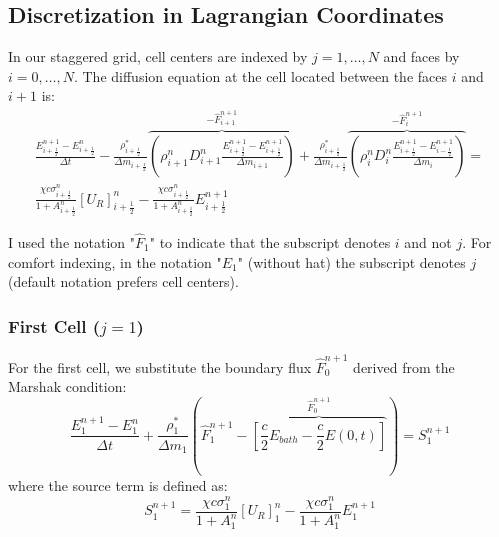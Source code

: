 \documentclass[11pt]{article}
\begin{document}
\subsection{Discretization in Lagrangian Coordinates}
In our staggered grid, cell centers are indexed by $j=1, \dots, N$ and faces by $i=0, \dots, N$. The diffusion equation at the cell located between the faces $i$ and $i+1$ is:
\begin{equation}
\begin{gathered}
    \frac{E_{i+\frac{1}{2}}^{n+1} - E_{i+\frac{1}{2}}^n}{\Delta t} - \frac{\rho_{i+\frac{1}{2}}^{*}}{\Delta m_{i+\frac{1}{2}}} \overbrace{\left(\rho_{i+1}^n D_{i+1}^n\frac{E_{i+\frac{3}{2}}^{n+1} - E_{i+\frac{1}{2}}^{n+1}}{\Delta m_{i+1}}\right)}^{-\hat{F}_{i+1}^{n+1}} + \frac{\rho_{i+\frac{1}{2}}^{*}}{\Delta m_{i+\frac{1}{2}}}\overbrace{\left(\rho_{i}^n D_{i}^n\frac{E_{i+\frac{1}{2}}^{n+1} - E_{i-\frac{1}{2}}^{n+1}}{\Delta m_{i}}\right)}^{-\hat{F}_{i}^{n+1}} = \\ 
    \frac{\chi c \sigma_{i+\frac{1}{2}}^{n}}{1 + A_{i+\frac{1}{2}}^n}[U_R]_{i+\frac{1}{2}}^n - \frac{\chi c \sigma_{i+\frac{1}{2}}^{n}}{1 + A_{i+\frac{1}{2}}^n} E_{i+\frac{1}{2}}^{n+1} 
\end{gathered}   
\end{equation}
\begin{notebox}
I used the notation "$\hat{F}_1$" to indicate that the subscript denotes $i$ and not $j$. For comfort indexing, in the notation "$E_1$" (without hat) the subscript denotes $j$ (default notation prefers cell centers).
\end{notebox}
\subsubsection*{First Cell ($j=1$)}
For the first cell, we substitute the boundary flux $\hat{F}_0^{n+1}$ derived from the Marshak condition:
\begin{equation}
    \frac{E_{1}^{n+1} - E_{1}^n}{\Delta t} + \frac{\rho_{1}^{*}}{\Delta m_{1}} \left( \hat{F}_{1}^{n+1} - \overbrace{\left[ \frac{c}{2} E_{bath} - \frac{c}{2} E(0,t) \right]}^{\hat{F}_0^{n+1}} \right) = S_1^{n+1}
\end{equation}
where the source term is defined as:
\begin{equation}
    S_1^{n+1} = \frac{\chi c \sigma_1^n}{1 + A_1^n}[U_R]_1^n - \frac{\chi c \sigma_1^n}{1 + A_1^n} E_1^{n+1}
\end{equation}
\end{document}
